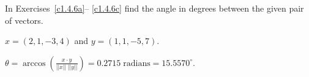 \documentclass{article}
\begin{document}



\matlabproblemlabel

\noindent In Exercises~\ref{c1.4.6a}-- \ref{c1.4.6c} find the angle in
degrees between the given pair of vectors.


\begin{computerExercise} \label{c1.4.6a}
$x=(2,1,-3,4)$ and $y=(1,1,-5,7)$.

\begin{solution}
\ans $\theta =
\arccos \left(\frac{x \cdot y}{||x||\;||y||}\right) =
0.2715 \; \mbox{radians} = 15.5570^\circ$.

\end{solution}
\end{computerExercise}


\end{document}

